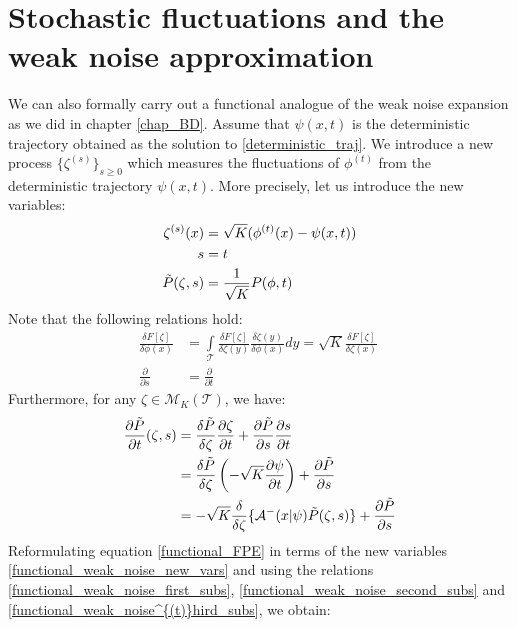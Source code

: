 \section{Stochastic fluctuations and the weak noise approximation}
We can also formally carry out a functional analogue of the weak noise expansion as we did in chapter \ref{chap_BD}. Assume that $\psi(x,t)$ is the deterministic trajectory obtained as the solution to \eqref{deterministic_traj}. We introduce a new process $\{\zeta^{(s)}\}_{s \geq 0}$ which measures the fluctuations of $\phi^{(t)}$ from the deterministic trajectory $\psi(x,t)$. More precisely, let us introduce the new variables:
\begin{equation}
\begin{aligned}
\label{functional_weak_noise_new_vars}
    \zeta^{(s)}(x) &= \sqrt{K}(\phi^{(t)}(x) - \psi(x,t))\\
    s &= t\\
    \Tilde{P}(\zeta,s) &= \frac{1}{\sqrt{K}}P(\phi,t)
\end{aligned}
\end{equation}
Note that the following relations hold:
\begin{align}
\frac{\delta F[\zeta]}{\delta \phi(x)} &= \int\limits_{\mathcal{T}}\frac{\delta F[\zeta]}{\delta \zeta(y)}\frac{\delta \zeta(y)}{\delta \phi(x)}dy = \sqrt{K}\frac{\delta F[\zeta]}{\delta \zeta(x)}\ \label{functional_weak_noise_first_subs}\\
\frac{\partial}{\partial s} &= \frac{\partial}{\partial t}\label{functional_weak_noise_second_subs}
\end{align}
Furthermore, for any $\zeta \in \mathcal{M}_{K}(\mathcal{T})$, we have:
\begin{align}
\frac{\partial \Tilde{P}}{\partial t}(\zeta,s) &= \frac{\delta \Tilde{P}}{\delta \zeta}\frac{\partial \zeta}{\partial t} + \frac{\partial \Tilde{P}}{\partial s}\frac{\partial s}{\partial t}\nonumber\\
    &=\frac{\delta \Tilde{P}}{\delta \zeta}\left(-\sqrt{K}\frac{\partial \psi}{\partial t}\right) + \frac{\partial \Tilde{P}}{\partial s}\nonumber\\
    &= -\sqrt{K}\frac{\delta}{\delta \zeta}\{\mathcal{A}^{-}(x|\psi)\Tilde{P}(\zeta,s)\} + \frac{\partial \Tilde{P}}{\partial s}\label{functional_weak_noise^{(t)}hird_subs}
\end{align}
Reformulating equation \eqref{functional_FPE} in terms of the new variables \eqref{functional_weak_noise_new_vars} and using the relations \eqref{functional_weak_noise_first_subs}, \eqref{functional_weak_noise_second_subs} and \eqref{functional_weak_noise^{(t)}hird_subs}, we obtain:
